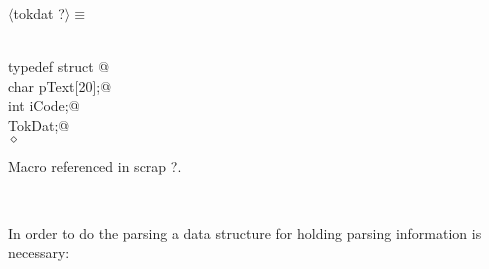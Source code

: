 \documentclass[12pt]{article}
\begin{document}
\begin{flushleft} \small
\begin{minipage}{\linewidth} \label{scrap16}
$\langle$tokdat {\footnotesize ?}$\rangle\equiv$
\vspace{-1ex}
\begin{list}{}{} \item
\mbox{}\verb@@\\
\mbox{}\verb@  typedef struct {@\\
\mbox{}\verb@                  char pText[20];@\\
\mbox{}\verb@                  int iCode;@\\
\mbox{}\verb@                 }  TokDat;@\\
\mbox{}\verb@@$\diamond$
\end{list}
\vspace{-1ex}
\footnotesize\addtolength{\baselineskip}{-1ex}
\begin{list}{}{\setlength{\itemsep}{-\parsep}\setlength{\itemindent}{-\leftmargin}}
\item Macro referenced in scrap ?.
\end{list}
\end{minipage}\\[4ex]
\end{flushleft}
In order to do the parsing a data structure for holding parsing information
is necessary:
\end{document}
